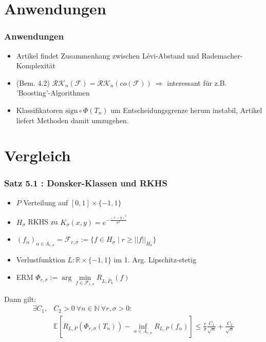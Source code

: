 \documentclass{beamer}
\newcommand{\R}{\mathbb{R}} %
\newcommand{\N}{\mathbb{N}} %
\newcommand{\E}{\mathbb{E}} %
\newcommand{\F}{\mathcal{F}}
\begin{document}
	\section{Anwendungen}
	
	\begin{frame}
		\frametitle{Anwendungen}
		\begin{itemize}
			\item Artikel findet Zusammenhang zwischen L\'evi-Abstand und Rademacher-Komplexität
			\item (Bem. 4.2) $\mathcal{RK}_n(\F) = \mathcal{RK}_n(co(\F)) \ \Rightarrow$ interessant für z.B. 'Boosting'-Algorithmen
			\item Klassifikatoren $\text{sign}\circ\Phi(T_n)$ um Entscheidungsgrenze herum instabil, Artikel liefert Methoden damit umzugehen.
		\end{itemize}
	\end{frame}



	\section{Vergleich}
	
	\begin{frame}
		\frametitle{Satz 5.1 : Donsker-Klassen und RKHS}
		\begin{itemize}
			\item $P$ Verteilung auf $[0,1] \times \{-1,1\}$
			\item $H_\sigma$ RKHS zu $K_\sigma(x,y) = e^{-\frac{(x-y)^2}{\sigma^2}}$
			\item $(f_\alpha)_{\alpha \in \Lambda_{r,\sigma}} = \F_{r,\sigma} := \{f \in H_{\sigma} \mid r \geq ||f||_{H_{\sigma}} \}$
			\item Verlustfunktion $L: \R \times \{-1,1\}$ im 1. Arg. Lipschitz-stetig
			\item ERM $\Phi_{r,\sigma} := \arg\min\limits_{f \in \F_{r,\sigma}} R_{L,\hat{P}_n}(f)$
		\end{itemize}
		Dann gilt:
		\begin{align*}
		\exists C_1,&C_2>0 \ \forall n \in \N \ \forall r,\sigma > 0 : \\
		& \E \left[ R_{L,P}(\Phi_{r,\sigma}(T_n)) - \inf\limits_{\alpha \in \Lambda_{r,\sigma}} R_{L,P}(f_\alpha) \right] \leq \frac{r}{\sigma} \frac{C_1}{\sqrt{n}} + \frac{C_2}{\sqrt{n}}
		\end{align*}
	\end{frame}
\end{document}
